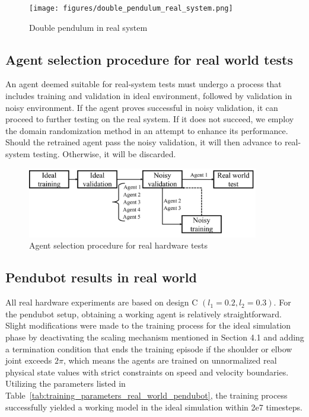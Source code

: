 \begin{figure}[H]
    \centering
    \texttt{[image: figures/double\_pendulum\_real\_system.png]}
    \caption{Double pendulum in real system}
    \label{fig:double_pendulum_real_system}
\end{figure}

\subsection{Agent selection procedure for real world tests}
An agent deemed suitable for real-system tests must undergo a process that includes training and validation in ideal environment, followed by validation in noisy environment. If the agent proves successful in noisy validation, it can proceed to further testing on the real system. If it does not succeed, we employ the domain randomization method in an attempt to enhance its performance. Should the retrained agent pass the noisy validation, it will then advance to real-system testing. Otherwise, it will be discarded.

\begin{figure}[H]
    \centering
    \includegraphics[width=0.9\textwidth]{figures/hardware_result/agent_selection_procedure.png}%
    \caption{Agent selection procedure for real hardware tests}
    \label{fig:agent_selection}
\end{figure}

\subsection{Pendubot results in real world}
All real hardware experiments are based on design C \( (l_1 = 0.2, l_2 = 0.3) \). For the pendubot setup, obtaining a working agent is relatively straightforward. Slight modifications were made to the training process for the ideal simulation phase by deactivating the scaling mechanism mentioned in Section 4.1 and adding a termination condition that ends the training episode if the shoulder or elbow joint exceeds \( 2\pi \), which means the agents are trained on unnormalized real physical state values with strict constraints on speed and velocity boundaries. Utilizing the parameters listed in Table~\ref{tab:training_parameters_real_world_pendubot}, the training process successfully yielded a working model in the ideal simulation within 2e7 timesteps.

